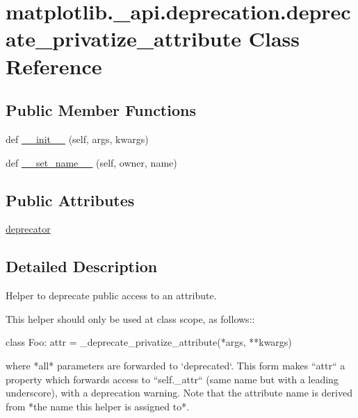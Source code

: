 \hypertarget{classmatplotlib_1_1__api_1_1deprecation_1_1deprecate__privatize__attribute}{}\section{matplotlib.\+\_\+api.\+deprecation.\+deprecate\+\_\+privatize\+\_\+attribute Class Reference}
\label{classmatplotlib_1_1__api_1_1deprecation_1_1deprecate__privatize__attribute}
\subsection*{Public Member Functions}
\begin{DoxyCompactItemize}
\item 
def \hyperlink{classmatplotlib_1_1__api_1_1deprecation_1_1deprecate__privatize__attribute_a2596563c4d4af72dd699338dc4bce095}{\+\_\+\+\_\+init\+\_\+\+\_\+} (self, args, kwargs)
\item 
def \hyperlink{classmatplotlib_1_1__api_1_1deprecation_1_1deprecate__privatize__attribute_ad5ee9d316158cb5dbcedf4f3d34c5e3a}{\+\_\+\+\_\+set\+\_\+name\+\_\+\+\_\+} (self, owner, name)
\end{DoxyCompactItemize}
\subsection*{Public Attributes}
\begin{DoxyCompactItemize}
\item 
\hyperlink{classmatplotlib_1_1__api_1_1deprecation_1_1deprecate__privatize__attribute_a41364120bf1f2e52b90d6e403a108b19}{deprecator}
\end{DoxyCompactItemize}


\subsection{Detailed Description}
\begin{DoxyVerb}Helper to deprecate public access to an attribute.

This helper should only be used at class scope, as follows::

    class Foo:
        attr = _deprecate_privatize_attribute(*args, **kwargs)

where *all* parameters are forwarded to `deprecated`.  This form makes
``attr`` a property which forwards access to ``self._attr`` (same name but
with a leading underscore), with a deprecation warning.  Note that the
attribute name is derived from *the name this helper is assigned to*.
\end{DoxyVerb}
 


